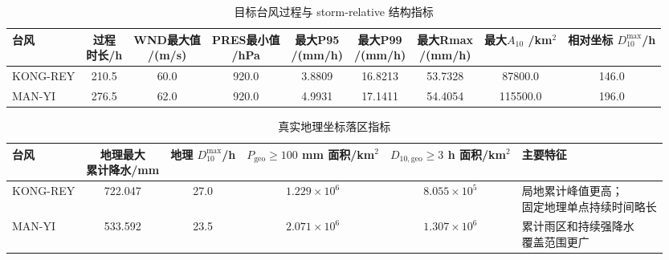 \documentclass[UTF8,a4paper,zihao=5]{ctexart}
\numberwithin{equation}{section}
\numberwithin{figure}{section}
\numberwithin{table}{section}
\begin{document}
\begingroup
\renewcommand{\thetable}{\thesection.\arabic{table}A}
\renewcommand{\theHtable}{\thetable}
\begin{table}[H]
\centering
\caption{目标台风过程与 storm-relative 结构指标}
\label{tab:p2_final_summary}
\label{tab:p2_final_summary_a}
\small
\setlength{\tabcolsep}{3pt}
\begin{tabular}{lcccccccc}
\toprule
台风 
& \makecell{过程\\时长/h}
& \makecell{WND最大值\\/(m/s)}
& \makecell{PRES最小值\\/hPa}
& \makecell{最大P95\\/(mm/h)}
& \makecell{最大P99\\/(mm/h)}
& \makecell{最大Rmax\\/(mm/h)}
& \makecell{最大$A_{10}$\\/km$^2$}
& \makecell{相对坐标\\$D_{10}^{\max}$/h} \\
\midrule
KONG-REY 
& 210.5 
& 60.0 
& 920.0 
& 3.8809 
& 16.8213 
& 53.7328 
& 87800.0 
& 146.0 \\
MAN-YI 
& 276.5 
& 62.0 
& 920.0 
& 4.9931 
& 17.1411 
& 54.4054 
& 115500.0 
& 196.0 \\
\bottomrule
\end{tabular}
\end{table}

\addtocounter{table}{-1}
\renewcommand{\thetable}{\thesection.\arabic{table}B}
\renewcommand{\theHtable}{\thetable}
\begin{table}[H]
\centering
\caption{真实地理坐标落区指标}
\label{tab:p2_final_summary_b}
\small
\setlength{\tabcolsep}{4pt}
\begin{tabularx}{\textwidth}{lcccc>{\raggedright\arraybackslash}X}
\toprule
台风
& \makecell{地理最大\\累计降水/mm}
& \makecell{地理\\$D_{10}^{\max}$/h}
& \makecell{$P_{\mathrm{geo}}\ge100$ mm\\面积/km$^2$}
& \makecell{$D_{10,\mathrm{geo}}\ge3$ h\\面积/km$^2$}
& 主要特征 \\
\midrule
KONG-REY
& 722.047
& 27.0
& $1.229\times 10^6$
& $8.055\times 10^5$
& \makecell[l]{局地累计峰值更高；\\固定地理单点持续时间略长} \\
MAN-YI
& 533.592
& 23.5
& $2.071\times 10^6$
& $1.307\times 10^6$
& \makecell[l]{累计雨区和持续强降水\\覆盖范围更广} \\
\bottomrule
\end{tabularx}
\end{table}
\endgroup
\end{document}
